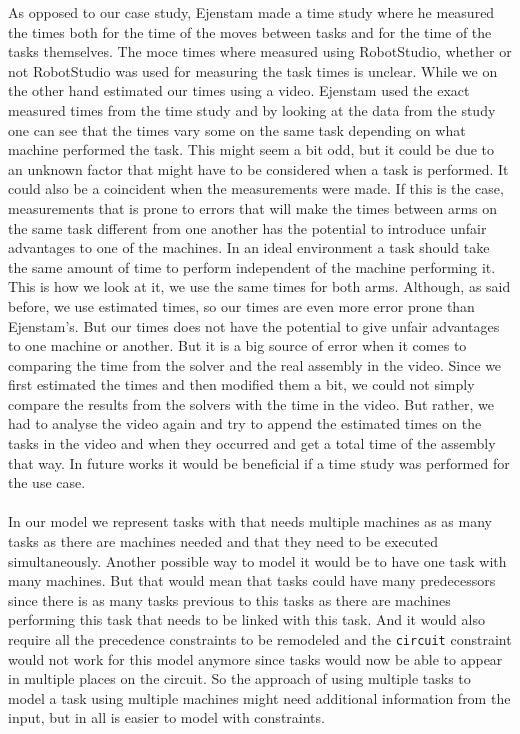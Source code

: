 As opposed to our case study, Ejenstam made a time study where he measured the times both for the time of the moves between tasks and for the time of the tasks themselves. The moce times where measured using RobotStudio\cite{robotstudio}, whether or not RobotStudio was used for measuring the task times is unclear. While we on the other hand estimated our times using a video. Ejenstam used the exact measured times from the time study and by looking at the data from the study one can see that the times vary some on the same task depending on what machine performed the task. This might seem a bit odd, but it could be due to an unknown factor that might have to be considered when a task is performed. It could also be a coincident when the measurements were made. If this is the case, measurements that is prone to errors that will make the times between arms on the same task different from one another has the potential to introduce unfair advantages to one of the machines. In an ideal environment a task should take the same amount of time to perform independent of the machine performing it. This is how we look at it, we use the same times for both arms. Although, as said before, we use estimated times, so our times are even more error prone than Ejenstam's. But our times does not have the potential to give unfair advantages to one machine or another. But it is a big source of error when it comes to comparing the time from the solver and the real assembly in the video. Since we first estimated the times and then modified them a bit, we could not simply compare the results from the solvers with the time in the video. But rather, we had to analyse the video again and try to append the estimated times on the tasks in the video and when they occurred and get a total time of the assembly that way. In future works it would be beneficial if a time study was performed for the use case.
\\\\
In our model we represent tasks with that needs multiple machines as as many tasks as there are machines needed and that they need to be executed simultaneously. Another possible way to model it would be to have one task with many machines. But that would mean that tasks could have many predecessors since there is as many tasks previous to this tasks as there are machines performing this task that needs to be linked with this task. And it would also require all the precedence constraints to be remodeled and the \texttt{circuit} constraint would not work for this model anymore since tasks would now be able to appear in multiple places on the circuit. So the approach of using multiple tasks to model a task using multiple machines might need additional information from the input, but in all is easier to model with constraints.

